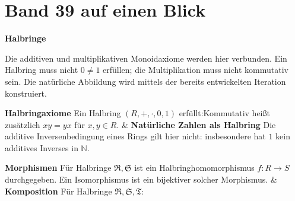 \chapter[Band 39: Halbringe]{Band 39 auf einen Blick}
\noindent\textbf{Halbringe}\par\medskip
Die additiven und multiplikativen Monoidaxiome werden hier verbunden.
Ein Halbring muss nicht \(0\ne1\) erfüllen; die Multiplikation muss
nicht kommutativ sein. Die natürliche Abbildung wird mittels der bereits
entwickelten Iteration konstruiert.

\begin{BandUebersicht}
\textbf{Halbringaxiome}
Ein Halbring \((R,+,\cdot,0,1)\) erfüllt:Kommutativ heißt zusätzlich \(xy=yx\) für \(x,y\in R\).
&
\textbf{Natürliche Zahlen als Halbring}
Die additive Inversenbedingung eines Rings gilt hier nicht:
insbesondere hat \(1\) kein additives Inverses in \(\mathbb N\).
 \\
\addlinespace[.8ex]

\textbf{Morphismen}
Für Halbringe \(\mathfrak R,\mathfrak S\) ist ein
Halbringhomomorphismus \(f:R\to S\) durchgegeben. Ein Isomorphismus ist ein bijektiver solcher Morphismus.
&
\textbf{Komposition}
Für Halbringe \(\mathfrak R,\mathfrak S,\mathfrak T\):
 \\
\addlinespace[.8ex]


\end{BandUebersicht}
